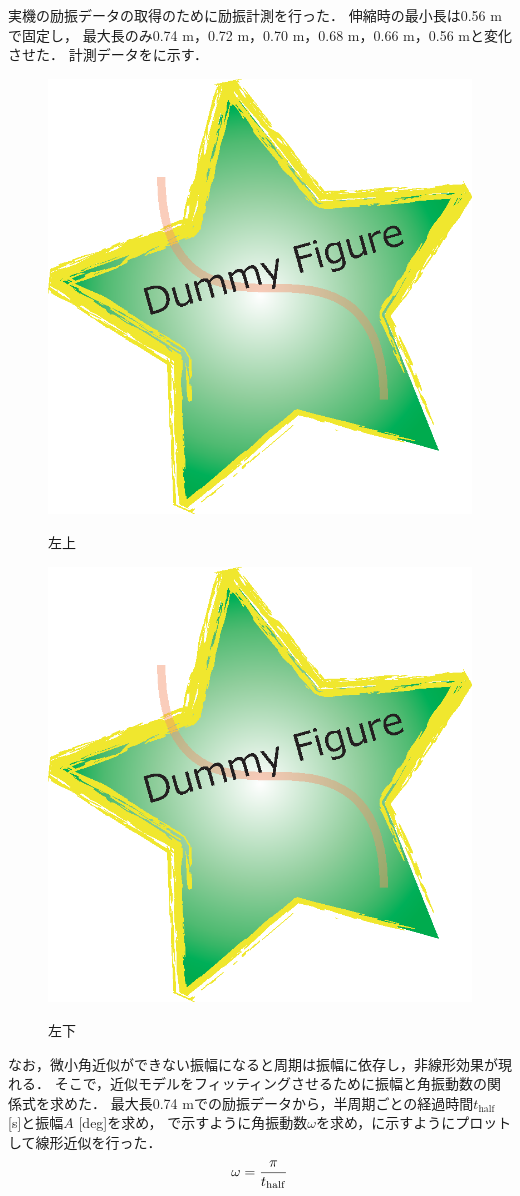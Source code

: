           実機の励振データの取得のために励振計測を行った．
          伸縮時の最小長は0.56 mで固定し，
          最大長のみ0.74 m，0.72 m，0.70 m，0.68 m，0.66 m，0.56 mと変化させた． 計測データをに示す．    
          \begin{figure}[h]
            \centering
            \begin{minipage}[b]{1\columnwidth}
                \centering
                \includegraphics[width=0.3\columnwidth]{fig/fig1.eps}
                \caption{左上}
                \label{fig:a}
                \vfill
                \includegraphics[width=0.3\columnwidth]{fig/fig1.eps}
                \caption{左下}
                \label{fig:b}
            \end{minipage}
            \end{figure}
          なお，微小角近似ができない振幅になると周期は振幅に依存し，非線形効果が現れる．
          そこで，近似モデルをフィッティングさせるために振幅と角振動数の関係式を求めた．
          最大長0.74 mでの励振データから，半周期ごとの経過時間$t_{\mathrm{half}}$ [s]と振幅$A$ [deg]を求め，
          で示すように角振動数$\omega$を求め，\figref{}に示すようにプロットして線形近似を行った．
          \begin{eqnarray}
            \equlabel{T2omega}
            \omega=\frac{\pi}{t_{\mathrm{half}}}
          \end{eqnarray}
